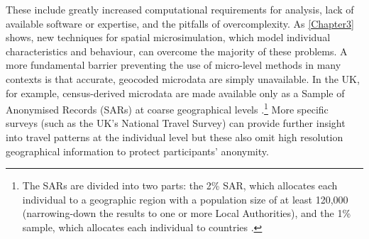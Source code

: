 These include greatly increased computational requirements for
analysis, lack of available software or expertise, and the pitfalls of
overcomplexity. As \cref{Chapter3} shows, new techniques for spatial
microsimulation, which model individual characteristics and behaviour,
can overcome the majority of these problems.
A more fundamental barrier preventing the use of micro-level
methods in many contexts is that accurate, geocoded
microdata are simply unavailable. In the UK, for example, census-derived
microdata are made available only as a Sample of Anonymised Records (SARs) at
coarse geographical levels
\citep{Dale2002}.\footnote{The
SARs are divided into two parts: the 2\% SAR, which
allocates each individual to a geographic region with a population
size of at least 120,000 (narrowing-down the results to one or more Local
Authorities), and the 1\% sample, which allocates each individual
to countries \citep{Dale2002}.
}
More specific surveys (such as the UK's National Travel Survey) can provide
further insight into travel patterns at the
individual level but these also omit high resolution geographical
information to protect participants' anonymity.
% 



